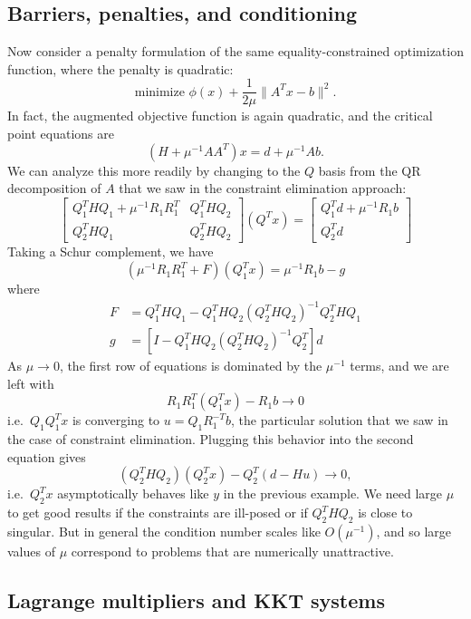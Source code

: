 \documentclass[12pt, leqno]{article} %
\begin{document}
\subsection{Barriers, penalties, and conditioning}

Now consider a penalty formulation of the same equality-constrained
optimization function, where the penalty is quadratic:
\[
  \mbox{minimize } \phi(x) + \frac{1}{2\mu} \|A^T x-b\|^2.
\]
In fact, the augmented objective function is again quadratic, and
the critical point equations are
\[
  (H + \mu^{-1} AA^T) x = d + \mu^{-1} A b.
\]
We can analyze this more readily by changing to the $Q$ basis from
the QR decomposition of $A$ that we saw in the constraint elimination
approach:
\[
\begin{bmatrix}
  Q_1^T H Q_1 + \mu^{-1} R_1 R_1^T & Q_1^T H Q_2 \\
  Q_2^T H Q_1 & Q_2^T H Q_2
\end{bmatrix}
(Q^T x) =
\begin{bmatrix}
  Q_1^T d + \mu^{-1} R_1 b \\
  Q_2^T d
\end{bmatrix}
\]
Taking a Schur complement, we have
\[
(\mu^{-1} R_1 R_1^T + F)(Q_1^T x) = \mu^{-1} R_1 b - g
\]
where
\begin{align*}
  F &= Q_1^T H Q_1 - Q_1^T H Q_2 (Q_2^T H Q_2)^{-1} Q_2^T H Q_1 \\
  g &= [I - Q_1^T H Q_2 (Q_2^T H Q_2)^{-1} Q_2^T] d
\end{align*}
As $\mu \rightarrow 0$, the first row of equations is dominated by the
$\mu^{-1}$ terms, and we are left with
\[
  R_1 R_1^T (Q_1^T x) - R_1 b \rightarrow 0
\]
i.e.~$Q_1 Q_1^T x$ is converging to $u = Q_1 R_1^{-T} b$, the
particular solution that we saw in the case of constraint elimination.
Plugging this behavior into the second equation gives
\[
  (Q_2^T H Q_2) (Q_2^T x) - Q_2^T (d-Hu) \rightarrow 0,
\]
i.e.~$Q_2^T x$ asymptotically behaves like $y$ in the previous
example.  We need large $\mu$ to get good results if the constraints
are ill-posed or if $Q_2^T H Q_2$ is close to singular.  But in
general the condition number scales like $O(\mu^{-1})$, and so large
values of $\mu$ correspond to problems that are numerically
unattractive.

\subsection{Lagrange multipliers and KKT systems}

\end{document}
